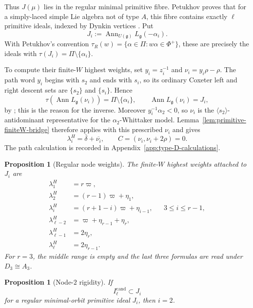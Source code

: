 \documentclass[11pt]{amsart}
\newtheorem{proposition}[theorem]{Proposition}
\theoremstyle{remark}
\numberwithin{equation}{section}
\begin{document}
Thus \(J(\mu)\) lies in the regular minimal primitive fibre.
Petukhov proves that for a simply-laced simple Lie algebra not of type \(A\),
this fibre contains
exactly \(\ell\) primitive ideals, indexed by Dynkin vertices
\cite[Proposition~5.4]{Petukhov2018}.  Put
\[
   J_i:=\operatorname{Ann}_{U(\mathfrak g)}L_{\mathfrak g}(-\alpha_i).
\]
With Petukhov's convention
\(\tau_R(w)=\{\alpha\in\Pi:w\alpha\in\Phi^+\}\), these are precisely the
ideals with \(\tau(J_i)=\Pi\setminus\{\alpha_i\}\).

To compute their finite-\(W\) highest weights, set \(y_i=z_i^{-1}\) and
\(\nu_i=y_i\rho-\rho\).  The path word \(y_i\) begins with \(s_2\) and ends
with \(s_i\), so its ordinary Coxeter left and right descent sets are
\(\{s_2\}\) and \(\{s_i\}\).  Hence
\[
   \tau\!\left(\operatorname{Ann}L_{\mathfrak g}(\nu_i)\right)
   =\Pi\setminus\{\alpha_i\},
   \qquad
   \operatorname{Ann}L_{\mathfrak g}(\nu_i)=J_i,
\]
by \cite[Proposition~5.4]{Petukhov2018}; this is the reason for the inverse.
Moreover \(y_i^{-1}\alpha_2<0\), so \(\nu_i\) is the
\(\langle s_2\rangle\)-antidominant representative for the
\(\alpha_2\)-Whittaker model.  Lemma~\ref{lem:primitive-finiteW-bridge}
therefore applies with this prescribed \(\nu_i\) and gives
\[
   \lambda_i^H=\bar\delta+\overline{\nu_i},
   \qquad C=(\nu_i,\nu_i+2\rho)=0.
\]
The path calculation is recorded in Appendix~\ref{app:type-D-calculations}.

\begin{proposition}[Regular node weights]
The finite-\(W\) highest weights attached to \(J_i\) are
\begin{align}
   \lambda_1^H
   &=
   r\varpi,
   \label{eq:node-weight-1}\\
   \lambda_2^H
   &=
   (r-1)\varpi+\eta_1,
   \\
   \lambda_i^H
   &=
   (r+1-i)\varpi+\eta_{i-1},
   &&3\le i\le r-1,
   \label{eq:node-weight-middle}\\
   \lambda_{\ell-2}^H
   &=
   \varpi+\eta_{r-1}+\eta_r,
   \\
   \lambda_{\ell-1}^H
   &=
   2\eta_r,
   \\
   \lambda_\ell^H
   &=
   2\eta_{r-1}.
   \label{eq:node-weight-spin2}
\end{align}
For \(r=3\), the middle range is empty and the last three formulas are read
under \(D_3\cong A_3\).
\end{proposition}

\begin{proposition}[Node-\(2\) rigidity]
\label{prop:node2-rigidity}
If
\[
   I_\ell^{\mathrm{cand}}\subset J_i
\]
for a regular minimal-orbit primitive ideal \(J_i\), then \(i=2\).
\end{proposition}
\end{document}
